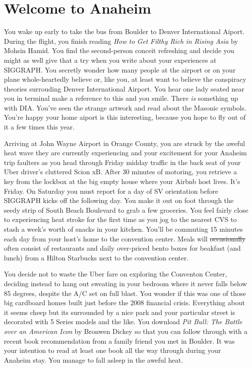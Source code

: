 \documentclass[../main.tex]{subfiles}
\begin{document}
\section{Welcome to Anaheim}

You wake up early to take the bus from Boulder to Denver International Aiport. During the flight, you finish reading \textit{How to Get Filthy Rich in Rising Asia} by Mohsin Hamid. You find the second-person conceit refreshing and decide you might as well give that a try when you write about your experiences at SIGGRAPH. You secretly wonder how many people at the airport or on your plane whole-heartedly believe or, like you, at least want to believe the conspiracy theories surrouding Denver International Airport. You hear one lady seated near you in terminal make a reference to this and you smile. There \textit{is} something up with DIA. You've seen the strange artwork and read about the Masonic symbols. You're happy your home aiport is this interesting, because you hope to fly out of it a few times this year.

Arriving at John Wayne Airport in Orange County, you are struck by the aweful heat wave they are currently experiencing and your excitement for your Anaheim trip faulters as you head through Friday midday traffic in the back seat of your Uber driver's cluttered Scion xB. After 30 minutes of motoring, you retrieve a key from the lockbox at the big empty house where your Airbnb host lives. It's Friday. On Saturday you must report for a day of SV orientation before SIGGRAPH kicks off the following day. You make it out on foot through the seedy strip of South Beach Boulevard to grab a few groceries. You feel fairly close to experiencing heat stroke for the first time as you jog to the nearest CVS to stash a week's worth of snacks in your kitchen. You'll be commuting 15 minutes each day from your host's home to the convention center. Meals will \sout{occasionally} often consist of restaurants and daily over-priced bento boxes for beakfast (and lunch) from a Hilton Starbucks next to the convention center.

You decide not to waste the Uber fare on exploring the Conventon Center, deciding instead to hang out sweating in your bedroom where it never falls below 85 degrees, despite the A/C set on full blast. You wonder if this was one of those big cardboard homes built just before the 2008 financial crisis. Everything about it seems cheep but its surrounded by a nice park and your particular street is decorated with 5 Series models and the like. You download \textit{Pit Bull: The Battle over an American Icon} by Bronwen Dickey so that you can follow through with a recent book recommendation from a family friend you met in Boulder. It was your intention to read at least one book all the way through during your Anaheim stay. You manage to fall asleep in the aweful heat.
 
\end{document}
